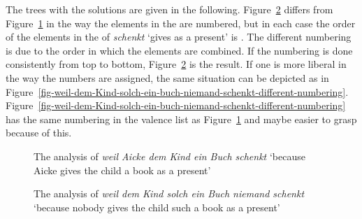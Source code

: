 \begin{enumerate}
The trees with the solutions are given in the
following. Figure~\ref{fig-weil-dem-Kind-solch-ein-buch-niemand-schenkt} differs from
Figure~\ref{fig-weil-Aicke-dem-Kind-ein-buch-schenkt} in the way the elements in the \compsl are
numbered, but in each case the order of the elements in the \compsl of \emph{schenkt} `gives as a
present' is \sliste{ \npnom, \npdat, \npacc{} }. The different numbering is due to the order in which
the elements are combined. If the numbering is done consistently from top to bottom,
Figure~\ref{fig-weil-dem-Kind-solch-ein-buch-niemand-schenkt} is the result. If one is more liberal
in the way the numbers are assigned, the same situation can be depicted as in
Figure~\ref{fig-weil-dem-Kind-solch-ein-buch-niemand-schenkt-different-numbering}. Figure~\ref{fig-weil-dem-Kind-solch-ein-buch-niemand-schenkt-different-numbering}
has the same numbering in the valence list as Figure~\ref{fig-weil-Aicke-dem-Kind-ein-buch-schenkt}
and maybe easier to grasp because of this.

\begin{figure}
\caption{\label{fig-weil-Aicke-dem-Kind-ein-buch-schenkt}The analysis of \emph{weil Aicke dem Kind
    ein Buch schenkt} `because Aicke gives the child a book as a present'}
\end{figure}

\begin{figure}
\caption{\label{fig-weil-dem-Kind-solch-ein-buch-niemand-schenkt}The analysis of \emph{weil dem Kind
    solch ein Buch niemand schenkt} `because nobody gives the child such a book as a present'}
\end{figure}


\end{enumerate}
